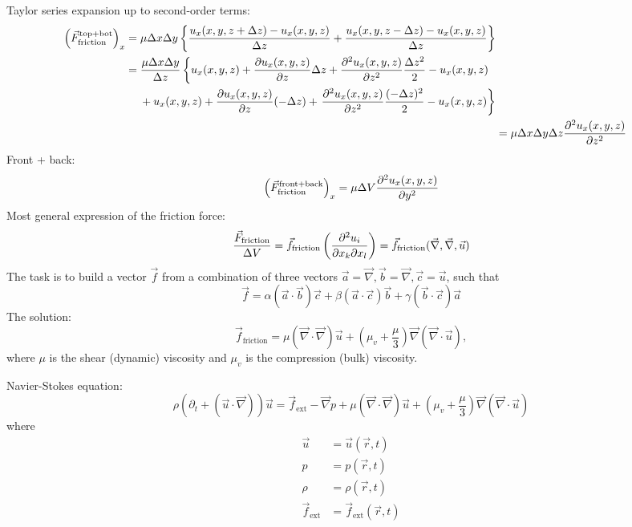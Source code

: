 Taylor series expansion up to second-order terms:
\begin{align}
\begin{split}
\left(\vec{F}_\mathrm{friction}^\mathrm{top+bot}\right)_x &= 
\mu \Delta x\Delta y \left\{\frac{u_x(x,y,z+\Delta z)-u_x(x,y,z)}{\Delta z} +  \frac{u_x(x,y,z-\Delta z)-u_x(x,y,z)}{\Delta z}\right\}\\
&= \frac{\mu\Delta x  \Delta y}{\Delta z}
\left\{u_x(x,y,z)+\frac{\partial u_x(x,y,z)}{\partial z}\Delta z + \frac{\partial^2 u_x(x,y,z)}{\partial z^2}\frac{\Delta z^2}{2} - u_x(x,y,z) \right.\\
&\hspace{4.5mm}  + u_x(x,y,z)+\frac{\partial u_x(x,y,z)}{\partial z}(-\Delta z) + \left. \frac{\partial^2 u_x(x,y,z)}{\partial z^2}\frac{(-\Delta z)^2}{2} - u_x(x,y,z) \right\}
\end{split}\\
&= \mu \Delta x \Delta y \Delta z \frac{\partial^2 u_x(x,y,z)}{\partial z^2}
\end{align}
Front + back:
\begin{equation}
\left(\vec{F}_\mathrm{friction}^\mathrm{front+back}\right)_x = \mu\Delta V \frac{\partial^2 u_x(x,y,z)}{\partial y^2}
\end{equation}
Most general expression of the friction force:
\begin{equation}
\frac{\vec{F}_\mathrm{friction}}{\Delta V} = \vec{f}_\mathrm{friction} \left(\frac{\partial ^2u_i}{\partial x_k\partial x_l}\right) = \vec{f}_\mathrm{friction} (\vec{\nabla},\vec{\nabla},\vec{u})
\end{equation}
The task is to build a vector $\vec{f}$ from a combination of three vectors $\vec{a}=\vec{\nabla}, \vec{b}=\vec{\nabla}, \vec{c}=\vec{u}$, such that
\begin{equation}
\vec{f} = \alpha\left(\vec{a}\cdot\vec{b}\right)\vec{c} + \beta\left(\vec{a}\cdot\vec{c}\right)\vec{b} + \gamma \left(\vec{b}\cdot\vec{c}\right)\vec{a}
\end{equation}
The solution:
\begin{equation}
\vec{f}_\mathrm{friction} = \mu\left(\vec{\nabla}\cdot\vec{\nabla}\right)\vec{u} + \left(\mu_v+\frac{\mu}{3}\right)\vec{\nabla}\left(\vec{\nabla}\cdot\vec{u}\right),
\end{equation}
where $\mu$ is the shear (dynamic) viscosity and $\mu_v$ is the compression (bulk) viscosity.

Navier-Stokes equation:
\begin{equation}
\rho\left(\partial_t+\left(\vec{u}\cdot\vec{\nabla}\right)\right)\vec{u} = \vec{f}_\mathrm{ext}-\vec{\nabla}p + \mu\left(\vec{\nabla}\cdot\vec{\nabla}\right)\vec{u} + \left(\mu_v+\frac{\mu}{3}\right)\vec{\nabla}\left(\vec{\nabla}\cdot\vec{u}\right)
\end{equation}
where
\begin{align}
\vec{u} &= \vec{u}\left(\vec{r},t\right)\\
p &= p\left(\vec{r},t\right)\\
\rho &= \rho\left(\vec{r},t\right)\\
\vec{f}_\mathrm{ext} &= \vec{f}_\mathrm{ext}\left(\vec{r},t\right)
\end{align}


